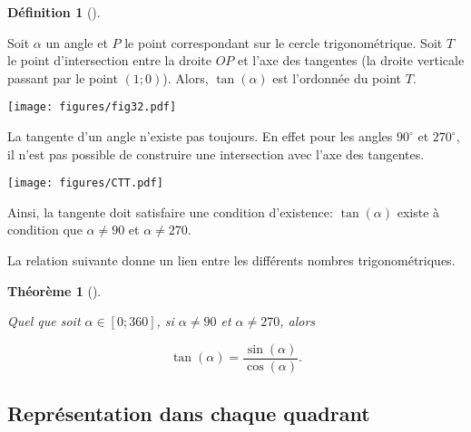 \documentclass[
  a4paper,
  DIV=11,
  numbers=noendperiod,
  oneside]{scrreprt}
\theoremstyle{definition}
\newtheorem{definition}{Définition}[chapter]
\theoremstyle{definition}
\theoremstyle{plain}
\newtheorem{theorem}{Théorème}[chapter]
\theoremstyle{definition}
\theoremstyle{remark}
\begin{document}
\begin{definition}[]\protect\hypertarget{def-tan}{}\label{def-tan}

Soit \(\alpha\) un angle et \(P\) le point correspondant sur le cercle
trigonométrique. Soit \(T\) le point d'intersection entre la droite
\(OP\) et l'axe des tangentes (la droite verticale passant par le point
\((1;0)\)). Alors, \(\tan(\alpha)\) est l'ordonnée du point \(T\).
\begin{center}
\texttt{[image: figures/fig32.pdf]}
\end{center}

\end{definition}

\begin{tcolorbox}[enhanced jigsaw, bottomrule=.15mm, colback=white, bottomtitle=1mm, toprule=.15mm, colbacktitle=quarto-callout-important-color!10!white, breakable, title=\textcolor{quarto-callout-important-color}{\faExclamation}\hspace{0.5em}{Condition d'existence}, arc=.35mm, left=2mm, toptitle=1mm, coltitle=black, rightrule=.15mm, opacityback=0, leftrule=.75mm, colframe=quarto-callout-important-color-frame, opacitybacktitle=0.6, titlerule=0mm]

La tangente d'un angle n'existe pas toujours. En effet pour les angles
\(90^\circ\) et \(270^\circ\), il n'est pas possible de construire une
intersection avec l'axe des tangentes. \begin{center}
\texttt{[image: figures/CTT.pdf]}
\end{center}

Ainsi, la tangente doit satisfaire une condition d'existence:
\(\tan(\alpha)\) existe à condition que \(\alpha\neq 90\) et
\(\alpha\neq 270\).

\end{tcolorbox}

La relation suivante donne un lien entre les différents nombres
trigonométriques.

\begin{theorem}[]\protect\hypertarget{thm-tan}{}\label{thm-tan}

Quel que soit \(\alpha\in[0;360]\), si \(\alpha\neq 90\) et
\(\alpha\neq 270\), alors

\[
\tan(\alpha)=\dfrac{\sin(\alpha)}{\cos(\alpha)}.
\]

\end{theorem}

\subsection{Représentation dans chaque
quadrant}\label{repruxe9sentation-dans-chaque-quadrant-1}
\end{document}
